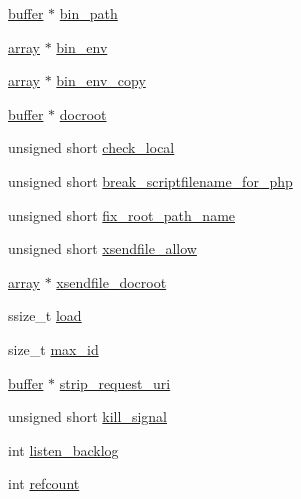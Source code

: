 \begin{DoxyCompactItemize}
\hyperlink{structbuffer}{buffer} $\ast$ \hyperlink{structfcgi__extension__host_aafa7f5935af4080ec15eb2293b804db9}{bin\-\_\-path}
\item 
\hyperlink{structarray}{array} $\ast$ \hyperlink{structfcgi__extension__host_a3e08a47d9440a7629058c1ab1507f774}{bin\-\_\-env}
\item 
\hyperlink{structarray}{array} $\ast$ \hyperlink{structfcgi__extension__host_a78a69c7361dd17fe6be7a45498629e2b}{bin\-\_\-env\-\_\-copy}
\item 
\hyperlink{structbuffer}{buffer} $\ast$ \hyperlink{structfcgi__extension__host_a0dcae70a69e898c98d1bc698b1887db2}{docroot}
\item 
unsigned short \hyperlink{structfcgi__extension__host_ae56011c0dbe54673fe797233984514b5}{check\-\_\-local}
\item 
unsigned short \hyperlink{structfcgi__extension__host_ada771e3cb76cc3269daf3ce9eded13af}{break\-\_\-scriptfilename\-\_\-for\-\_\-php}
\item 
unsigned short \hyperlink{structfcgi__extension__host_a07b4d2b5802995d2dbc56e324d50dc1a}{fix\-\_\-root\-\_\-path\-\_\-name}
\item 
unsigned short \hyperlink{structfcgi__extension__host_a8c978afa31288861b2b5b9917aed34a6}{xsendfile\-\_\-allow}
\item 
\hyperlink{structarray}{array} $\ast$ \hyperlink{structfcgi__extension__host_a1304d5929c12516a150b78a59139a0b0}{xsendfile\-\_\-docroot}
\item 
ssize\-\_\-t \hyperlink{structfcgi__extension__host_aff5283f567341a8ffa727dcf83fc0254}{load}
\item 
size\-\_\-t \hyperlink{structfcgi__extension__host_a9748fdf000b78644fa33b92c39006166}{max\-\_\-id}
\item 
\hyperlink{structbuffer}{buffer} $\ast$ \hyperlink{structfcgi__extension__host_aa593d8c96001f747795610eca69cc646}{strip\-\_\-request\-\_\-uri}
\item 
unsigned short \hyperlink{structfcgi__extension__host_ab2ba5563fd48db1f1ceaa2b9faaebfb3}{kill\-\_\-signal}
\item 
int \hyperlink{structfcgi__extension__host_a3506ef25504b8bbb690cff023e584b9a}{listen\-\_\-backlog}
\item 
int \hyperlink{structfcgi__extension__host_a8a7d3cb5d5c201760bb5da036126ffd1}{refcount}
\end{DoxyCompactItemize}


